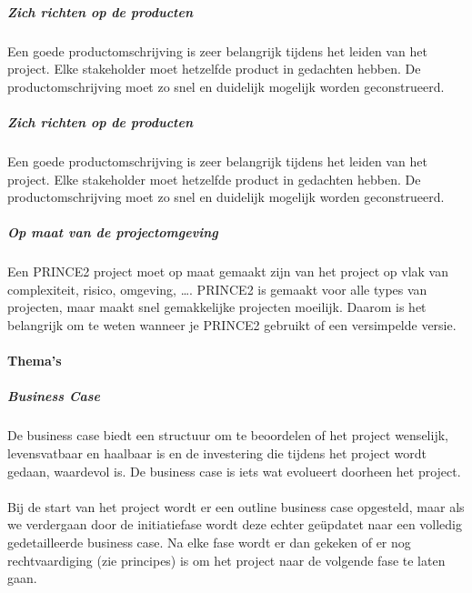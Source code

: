 \documentclass[]{article}
\begin{document}
\subparagraph{Zich richten op de producten}
Een goede productomschrijving is zeer belangrijk tijdens het leiden van het project. Elke stakeholder moet hetzelfde product in gedachten hebben. De productomschrijving moet zo snel en duidelijk mogelijk worden geconstrueerd.

\subparagraph{Zich richten op de producten}
Een goede productomschrijving is zeer belangrijk tijdens het leiden van het project. Elke stakeholder moet hetzelfde product in gedachten hebben. De productomschrijving moet zo snel en duidelijk mogelijk worden geconstrueerd.

\subparagraph{Op maat van de projectomgeving}
Een PRINCE2 project moet op maat gemaakt zijn van het project op vlak van complexiteit, risico, omgeving, …. PRINCE2 is gemaakt voor alle types van projecten, maar maakt snel gemakkelijke projecten moeilijk. Daarom is het belangrijk om te weten wanneer je PRINCE2 gebruikt of een versimpelde versie.


\paragraph{Thema's}
\subparagraph{Business Case}
De business case biedt een structuur om te beoordelen of het project wenselijk, levensvatbaar en haalbaar is en de investering die tijdens het project wordt gedaan, waardevol is. De business case is iets wat evolueert doorheen het project. \\\\
Bij de start van het project wordt er een outline business case opgesteld, maar als we verdergaan door de initiatiefase wordt deze echter geüpdatet naar een volledig gedetailleerde business case. Na elke fase wordt er dan gekeken of er nog rechtvaardiging (zie principes) is om het project naar de volgende fase te laten gaan.
\end{document}

